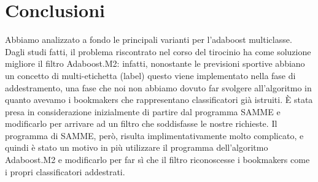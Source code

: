 \section {Conclusioni}
Abbiamo analizzato a fondo le principali varianti per l'adaboost multiclasse. Dagli studi fatti, 
il problema riscontrato nel corso del tirocinio ha come soluzione migliore il filtro 
Adaboost.M2: infatti, nonostante le previsioni sportive abbiano un concetto di multi-etichetta (label) 
questo viene implementato nella fase di addestramento, una fase che noi non abbiamo dovuto far svolgere 
all'algoritmo in quanto avevamo i bookmakers che rappresentano classificatori gi\`a istruiti. \`E stata 
presa in considerazione inizialmente di partire dal programma SAMME e modificarlo per arrivare ad un filtro 
che soddisfasse le nostre richieste. Il programma di SAMME, per\`o, risulta implimentativamente molto complicato, 
e quindi \`e stato un motivo in pi\`u utilizzare il programma dell'algoritmo Adaboost.M2 e modificarlo 
per far s\`i che il filtro riconoscesse i bookmakers come i propri classificatori addestrati. 